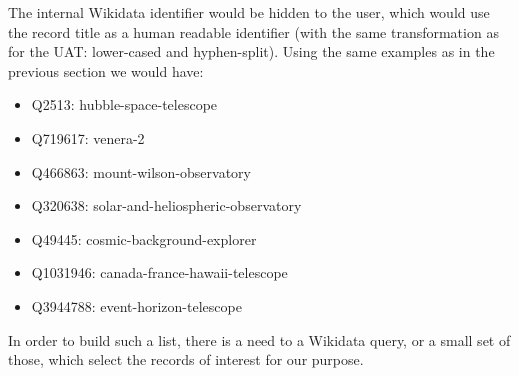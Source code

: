 \documentclass[11pt,a4paper]{ivoa}
\begin{document}
The internal Wikidata identifier would be hidden to the user, which 
would use the record title as a human readable identifier (with the 
same transformation as for the UAT: lower-cased and hyphen-split). 
Using the same examples as in the previous section we would have: 
\begin{itemize}
\item Q2513: hubble-space-telescope
\item Q719617: venera-2
\item Q466863: mount-wilson-observatory
\item Q320638: solar-and-heliospheric-observatory
\item Q49445: cosmic-background-explorer
\item Q1031946: canada-france-hawaii-telescope
\item Q3944788: event-horizon-telescope
\end{itemize}
In order to build such a list, there is a need to a Wikidata query, 
or a small set of those, which select the records of interest for
our purpose.
\end{document}
